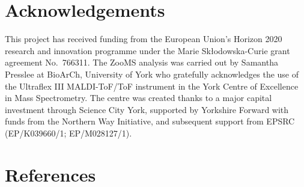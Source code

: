 \documentclass[review]{elsarticle} %
\begin{document}
\hypertarget{acknowledgements}{%
\section{Acknowledgements}\label{acknowledgements}}

This project has received funding from the European Union's Horizon 2020 research and innovation programme under the Marie Skłodowska-Curie grant agreement No.~766311. The ZooMS analysis was carried out by Samantha Presslee at BioArCh, University of York who gratefully acknowledges the use of the Ultraflex III MALDI-ToF/ToF instrument in the York Centre of Excellence in Mass Spectrometry. The centre was created thanks to a major capital investment through Science City York, supported by Yorkshire Forward with funds from the Northern Way Initiative, and subsequent support from EPSRC (EP/K039660/1; EP/M028127/1).

\hypertarget{references}{%
\section*{References}\label{references}}
\end{document}
